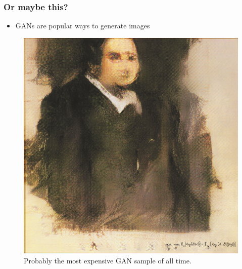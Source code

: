 \documentclass[10pt,mathserif]{beamer}
\begin{document}
\begin{frame}
  \frametitle{Or maybe this?}
\begin{itemize}
\item GANs are popular ways to generate images
\end{itemize}
\begin{figure}[ht]
  \centering
  \includegraphics[width=0.3\paperwidth]{figure/gan_portrait.jpg}
  \caption{Probably the most expensive GAN sample of all
    time. \label{fig:gan_portrait} }
\end{figure}
\end{frame}
\end{document}
